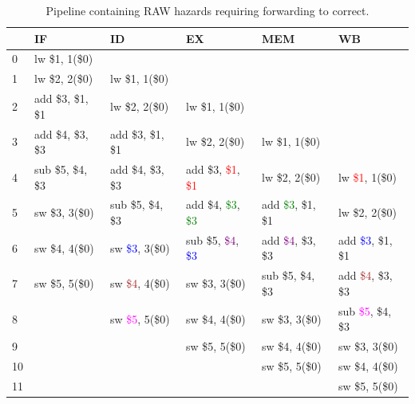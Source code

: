 \begin{table}[h]
    \begin{tabular}{l|lllll}
    ~  & IF                & ID                                  & EX                                                      & MEM                                   & WB \\ \hline
    0  & lw \$1, 1(\$0)    & ~                                   & ~                                                       & ~                                     & ~  \\
    1  & lw \$2, 2(\$0)    & lw \$1, 1(\$0)                      & ~                                                       & ~                                     & ~  \\
    2  & add \$3, \$1, \$1 & lw \$2, 2(\$0)                      & lw \$1, 1(\$0)                                          & ~                                     & ~  \\
    3  & add \$4, \$3, \$3 & add \$3, \$1, \$1                   & lw \$2, 2(\$0)                                          & lw \$1, 1(\$0)                        & ~  \\
    4  & sub \$5, \$4, \$3 & add \$4, \$3, \$3                   & add \$3, \textcolor{red}{\$1}, \textcolor{red}{\$1}     & lw \$2, 2(\$0)                        & lw \textcolor{red}{\$1}, 1(\$0)   \\
    5  & sw \$3, 3(\$0)    & sub \$5, \$4, \$3                   & add \$4, \textcolor{green}{\$3}, \textcolor{green}{\$3} & add \textcolor{green}{\$3}, \$1, \$1  & lw \$2, 2(\$0)   \\
    6  & sw \$4, 4(\$0)    & sw \textcolor{blue}{\$3}, 3(\$0)    & sub \$5, \textcolor{purple}{\$4}, \textcolor{blue}{\$3} & add \textcolor{purple}{\$4}, \$3, \$3 & add \textcolor{blue}{\$3}, \$1, \$1 \\
    7  & sw \$5, 5(\$0)    & sw \textcolor{brown}{\$4}, 4(\$0)   & sw \$3, 3(\$0)                                          & sub \$5, \$4, \$3                     & add \textcolor{brown}{\$4}, \$3, \$3 \\
    8  & ~                 & sw \textcolor{magenta}{\$5}, 5(\$0) & sw \$4, 4(\$0)                                          & sw \$3, 3(\$0)                        & sub \textcolor{magenta}{\$5}, \$4, \$3 \\
    9  & ~                 & ~                                   & sw \$5, 5(\$0)                                          & sw \$4, 4(\$0)                        & sw \$3, 3(\$0)   \\
    10 & ~                 & ~                                   & ~                                                       & sw \$5, 5(\$0)                        & sw \$4, 4(\$0)   \\
    11 & ~                 & ~                                   & ~                                                       & ~                                     & sw \$5, 5(\$0)   \\
    \end{tabular}
\caption{Pipeline containing RAW hazards requiring forwarding to correct.}
\label{tbl:forwarding}
\end{table}

